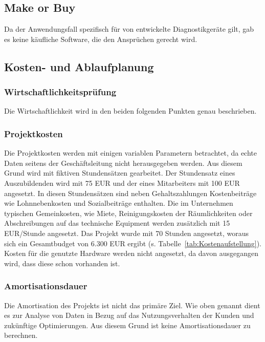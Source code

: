 \subsection{\glqq Make or Buy\grqq}
\label{sec:MakeOrBuy}
Da der Anwendungsfall spezifisch für von {\betriebNameKzf} entwickelte Diagnostikgeräte gilt, gab es keine käufliche Software, die den Ansprüchen gerecht wird.

\subsection{Kosten- und Ablaufplanung}
\label{sec:KostenAblaufPlanung}

\subsubsection{Wirtschaftlichkeitsprüfung}
\label{sec:Wirtschaftlichkeitspruefung}
Die Wirtschaftlichkeit wird in den beiden folgenden Punkten genau beschrieben.

\subsubsection{Projektkosten}
\label{sec:Projektkosten}
Die Projektkosten werden mit einigen variablen Parametern betrachtet, da echte Daten seitens der Geschäftsleitung nicht herausgegeben werden. Aus diesem Grund wird mit fiktiven Stundensätzen gearbeitet. Der Stundensatz eines Auszubildenden wird mit 75 EUR und der eines Mitarbeiters mit 100 EUR angesetzt. In diesen Stundensätzen sind neben Gehaltszahlungen Kostenbeiträge  wie Lohnnebenkosten und Sozialbeiträge enthalten. Die im Unternehmen typischen Gemeinkosten, wie Miete, Reinigungskosten der Räumlichkeiten oder Abschreibungen auf das technische Equipment werden zusätzlich mit 15 EUR/Stunde angesetzt. Das Projekt wurde mit 70 Stunden angesetzt, woraus sich ein Gesamtbudget von 6.300 EUR ergibt (s. Tabelle~\ref{tab:Kostenaufstellung}).
\\

Kosten für die genutzte Hardware werden nicht angesetzt, da davon ausgegangen wird, dass diese schon vorhanden ist.

\subsubsection{Amortisationsdauer}
\label{sec:Amortisationsdauer}
Die Amortisation des Projekts ist nicht das primäre Ziel. Wie oben genannt dient es zur Analyse von Daten in Bezug auf das Nutzungsverhalten der Kunden und zukünftige Optimierungen. Aus diesem Grund ist keine Amortisationsdauer zu berechnen.

